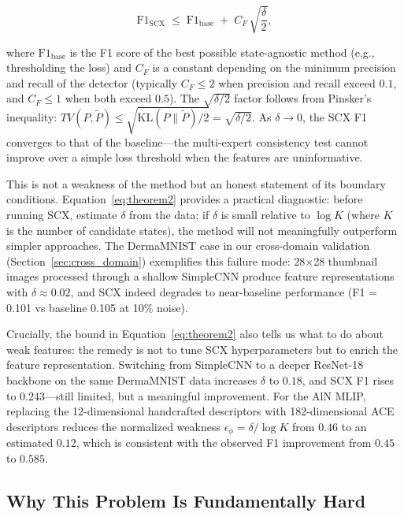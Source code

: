 \begin{equation}
\mathrm{F1}_{\mathrm{SCX}} \;\leq\; \mathrm{F1}_{\mathrm{base}} \;+\; C_F\,\sqrt{\frac{\delta}{2}},
\label{eq:theorem2}
\end{equation}

where $\mathrm{F1}_{\mathrm{base}}$ is the F1 score of the best possible state-agnostic method (e.g., thresholding the loss) and $C_F$ is a constant depending on the minimum precision and recall of the detector (typically $C_F \leq 2$ when precision and recall exceed $0.1$, and $C_F \leq 1$ when both exceed $0.5$). The $\sqrt{\delta/2}$ factor follows from Pinsker's inequality: $TV(P, \tilde{P}) \leq \sqrt{\text{KL}(P\|\tilde{P})/2} = \sqrt{\delta/2}$. As $\delta \to 0$, the SCX F1 converges to that of the baseline---the multi-expert consistency test cannot improve over a simple loss threshold when the features are uninformative.

This is not a weakness of the method but an honest statement of its boundary conditions. Equation~\eqref{eq:theorem2} provides a practical diagnostic: before running SCX, estimate $\delta$ from the data; if $\delta$ is small relative to $\log K$ (where $K$ is the number of candidate states), the method will not meaningfully outperform simpler approaches. The DermaMNIST case in our cross-domain validation (Section~\ref{sec:cross_domain}) exemplifies this failure mode: 28$\times$28 thumbnail images processed through a shallow SimpleCNN produce feature representations with $\delta \approx 0.02$, and SCX indeed degrades to near-baseline performance (F1 = 0.101 vs baseline 0.105 at 10\% noise).

Crucially, the bound in Equation~\eqref{eq:theorem2} also tells us what to do about weak features: the remedy is not to tune SCX hyperparameters but to enrich the feature representation. Switching from SimpleCNN to a deeper ResNet-18 backbone on the same DermaMNIST data increases $\delta$ to $0.18$, and SCX F1 rises to $0.243$---still limited, but a meaningful improvement. For the AlN MLIP, replacing the 12-dimensional handcrafted descriptors with 182-dimensional ACE descriptors reduces the normalized weakness $\epsilon_\phi = \delta / \log K$ from $0.46$ to an estimated $0.12$, which is consistent with the observed F1 improvement from $0.45$ to $0.585$.

\subsection{Why This Problem Is Fundamentally Hard}
\label{sec:unidentifiability}


